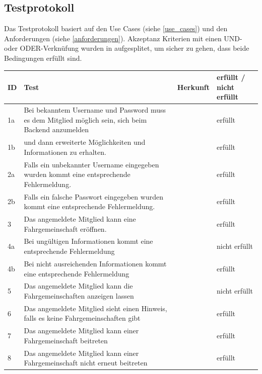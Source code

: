 \subsection{Testprotokoll}
Das Testprotokoll basiert auf den Use Cases (siehe \ref{use_cases}) und den Anforderungen (siehe \ref{anforderungen}). Akzeptanz Kriterien mit einen UND- oder ODER-Verknüfung wurden in aufgesplitet, um sicher zu gehen, dass beide Bedingungen erfüllt sind.

\begin{longtable}{ l | p{7cm} | l | l }

	\hline
	\rowcolor{gray}
	ID	&	Test			&	Herkunft			&	erfüllt / nicht erfüllt\\ \hline
	1a	&	Bei bekanntem Username und Password muss es dem Mitglied möglich sein, sich beim Backend anzumelden			
				&	\nameref{table:req_1} 	&	erfüllt\\ \hline
	1b	&	und dann erweiterte Möglichkeiten und Informationen zu erhalten.
				&	\nameref{table:req_1} 	&	erfüllt\\ \hline
	2a	&	Falls ein unbekannter Username eingegeben wurden kommt eine entsprechende Fehlermeldung.			
				&	\nameref{table:req_1} 	&	erfüllt\\ \hline
	2b	&	Falls ein falsche Passwort eingegeben wurden kommt eine entsprechende Fehlermeldung.			
				&	\nameref{table:req_1} 	&	erfüllt\\ \hline
	3	&	Das angemeldete Mitglied kann eine Fahrgemeinschaft eröffnen.		
				&	\nameref{table:req_2} 	&	erfüllt\\ \hline
	4a	&	Bei ungültigen Informationen kommt eine entsprechende Fehlermeldung
				&	\nameref{table:req_2} 	&	nicht erfüllt\\ \hline
	4b	&	Bei nicht ausreichenden Informationen kommt eine entsprechende Fehlermeldung
				&	\nameref{table:req_2} 	&	erfüllt\\ \hline
	5	&	Das angemeldete Mitglied kann die Fahrgemeinschaften anzeigen lassen
				&	\nameref{table:req_3} 	&	nicht erfüllt\\ \hline
	6	&	Das angemeldete Mitglied sieht einen Hinweis, falls es keine Fahrgemeinschaften gibt
				&	\nameref{table:req_3} 	&	erfüllt\\ \hline
	7	&	Das angemeldete Mitglied kann einer Fahrgemeinschaft beitreten
				&	\nameref{table:req_4} 	&	erfüllt\\ \hline
	8	&	Das angemeldete Mitglied kann einer Fahrgemeinschaft nicht erneut beitreten
				&	\nameref{table:req_4} 	&	erfüllt\\ \hline

\end{longtable}
